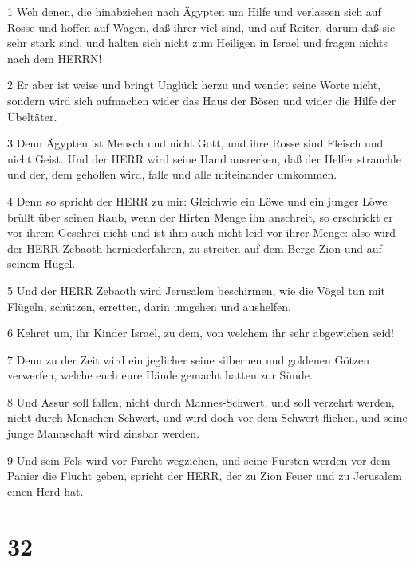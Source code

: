 \par 1 Weh denen, die hinabziehen nach Ägypten um Hilfe und verlassen sich auf Rosse und hoffen auf Wagen, daß ihrer viel sind, und auf Reiter, darum daß sie sehr stark sind, und halten sich nicht zum Heiligen in Israel und fragen nichts nach dem HERRN!
\par 2 Er aber ist weise und bringt Unglück herzu und wendet seine Worte nicht, sondern wird sich aufmachen wider das Haus der Bösen und wider die Hilfe der Übeltäter.
\par 3 Denn Ägypten ist Mensch und nicht Gott, und ihre Rosse sind Fleisch und nicht Geist. Und der HERR wird seine Hand ausrecken, daß der Helfer strauchle und der, dem geholfen wird, falle und alle miteinander umkommen.
\par 4 Denn so spricht der HERR zu mir: Gleichwie ein Löwe und ein junger Löwe brüllt über seinen Raub, wenn der Hirten Menge ihn anschreit, so erschrickt er vor ihrem Geschrei nicht und ist ihm auch nicht leid vor ihrer Menge: also wird der HERR Zebaoth herniederfahren, zu streiten auf dem Berge Zion und auf seinem Hügel.
\par 5 Und der HERR Zebaoth wird Jerusalem beschirmen, wie die Vögel tun mit Flügeln, schützen, erretten, darin umgehen und aushelfen.
\par 6 Kehret um, ihr Kinder Israel, zu dem, von welchem ihr sehr abgewichen seid!
\par 7 Denn zu der Zeit wird ein jeglicher seine silbernen und goldenen Götzen verwerfen, welche euch eure Hände gemacht hatten zur Sünde.
\par 8 Und Assur soll fallen, nicht durch Mannes-Schwert, und soll verzehrt werden, nicht durch Menschen-Schwert, und wird doch vor dem Schwert fliehen, und seine junge Mannschaft wird zinsbar werden.
\par 9 Und sein Fels wird vor Furcht wegziehen, und seine Fürsten werden vor dem Panier die Flucht geben, spricht der HERR, der zu Zion Feuer und zu Jerusalem einen Herd hat.

\chapter{32}


